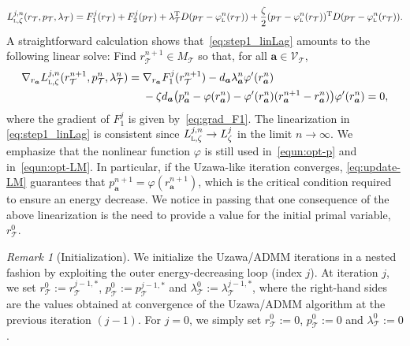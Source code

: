 \documentclass[a4paper,11pt]{article}
\theoremstyle{definition}
\theoremstyle{remark}
\newtheorem{remark}{Remark}[section]
\numberwithin{equation}{section}
\newcommand{\disr}{r_\calT}
\newcommand{\disp}{p_\calT}
\newcommand{\disM}{M_\calT}
\newcommand{\disLamb}{\lambda_\calT}
\newcommand{\ba}{{\boldsymbol a}}
\newcommand{\calT}{\mathcal{T}}
\newcommand{\calV}{\mathcal{V}}
\newcommand{\tr}{^{\mathrm{T}}}
\newcommand{\vertex}{\calV_\calT}
\begin{document}
\begin{equation}
{L}^{j,n}_{\textsc{l},\zeta}(\disr,\disp,\disLamb)=F^j_1(\disr) + F^j_2(\disp) +  \disLamb\tr  D (\disp-\varphi_{\textsc{l}}^n(\disr)) +\frac{\zeta}{2} (\disp-\varphi_{\textsc{l}}^n(\disr))\tr D (\disp-\varphi_{\textsc{l}}^n(\disr)).
\end{equation}
A straightforward calculation shows that~\eqref{eq:step1_linLag} amounts to the following linear solve: Find $\disr^{n+1}\in\disM$ so that, for all $\ba\in \vertex$,
\begin{align}\label{gradL:r}
\nabla_{r_{\ba}}{L}^{j,n}_{\textsc{l},\zeta}(\disr^{n+1}, \disp^n, \disLamb^n)\notag = {}& \nabla_{r_{\ba}}F^j_1(\disr^{n+1})  - d_{\ba}\lambda_{\ba}^n \varphi'(r_{\ba}^n) \\&-\zeta d_{\ba} \big(p_{\ba}^n -\varphi(r_{\ba}^n) -\varphi'(r_{\ba}^n)(r^{n+1}_{\ba}-r_{\ba}^{n})\big)\varphi'(r_{\ba}^n) = 0, 
\end{align}
where the gradient of $F^j_1$ is given by~\eqref{eq:grad_F1}. The linearization in \eqref{eq:step1_linLag} is consistent since  ${L}^{j,n}_{\textsc{l},\zeta} \rightarrow {L}^{j}_{\zeta}$ in the limit $n \rightarrow \infty.$
We emphasize that the nonlinear function $\varphi$ is still used in~\eqref{equn:opt-p} and in~\eqref{equn:opt-LM}. In particular, if the Uzawa-like iteration converges, \eqref{eq:update-LM} guarantees that $p_\ba^{n+1} = \varphi(r_\ba^{n+1})$, which is the critical condition required to ensure an energy decrease. We notice in passing that one consequence of the above linearization is the need to provide a value for the initial primal variable, $\disr^0$.

\begin{remark}[Initialization] \label{rem:init}
We initialize the Uzawa/ADMM iterations in a nested fashion by exploiting the outer energy-decreasing loop (index $j$). At iteration $j$, we set $\disr^0:=\disr^{j-1,*}$, $\disp^0:=\disp^{j-1,*}$ and $\disLamb^0:=\disLamb^{j-1,*}$, where the right-hand sides are the values obtained at convergence of the Uzawa/ADMM algorithm at the previous iteration $(j-1)$. For $j=0$, we simply set $\disr^0:=0$, $\disp^0:=0$ and $\disLamb^0:=0$.
\end{remark}
\end{document}

